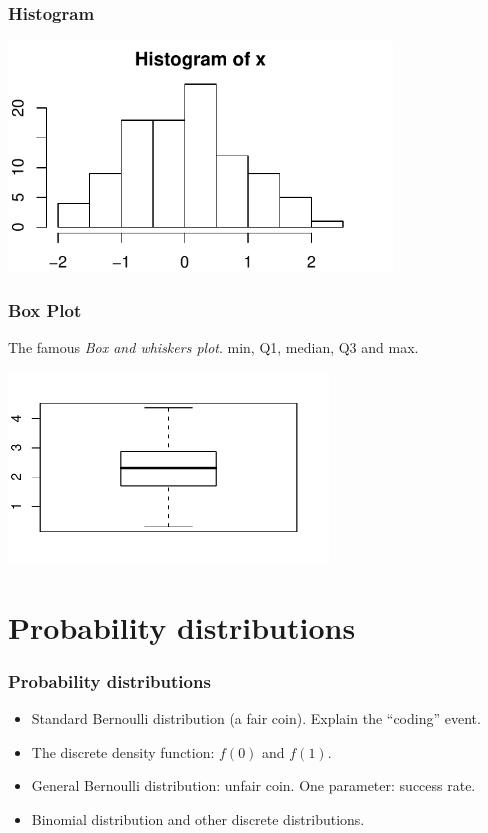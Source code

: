 \begin{frame} \frametitle{Histogram}
  \begin{center}
    \includegraphics[height=2.4in]{histogram.pdf}
  \end{center}
\end{frame}

\begin{frame} \frametitle{Box Plot}
  The famous \textit{Box and whiskers plot}. min, Q1, median, Q3 and max.
  \begin{center}
    \includegraphics[height=2.0in]{boxplot.pdf}
  \end{center}
\end{frame}

\section{Probability distributions}

\begin{frame}
  \frametitle{Probability distributions}
  \begin{itemize}
  \item Standard Bernoulli distribution (a fair coin). Explain the
    ``coding'' event.
  \item The discrete density function: $f(0)$ and $f(1)$.
  \item General Bernoulli distribution: unfair coin. One parameter:
    success rate.
  \item Binomial distribution and other discrete distributions.
  \end{itemize}
\end{frame}

